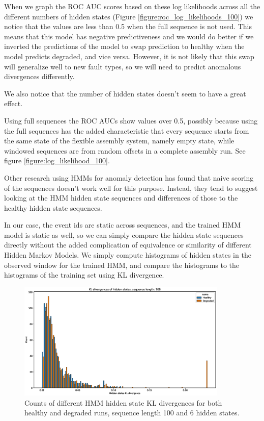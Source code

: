 \documentclass[journal]{IEEEtran}
\begin{document}
When we graph the ROC AUC scores based on these log likelihoods across all the different numbers of hidden states (Figure \ref{figure:roc_log_likelihoods_100}) we notice that the values are less than 0.5 when the full sequence is not used. This means that this model has negative predictiveness and we would do better if we inverted the predictions of the model to swap prediction to healthy when the model predicts degraded, and vice versa. However, it is not likely that this swap will generalize well to new fault types, so we will need to predict anomalous divergences differently.

We also notice that the number of hidden states doesn't seem to have a great effect.

Using full sequences the ROC AUCs show values over 0.5, possibly because using the full sequences has the added characteristic that every sequence starts from the same state of the flexible assembly system, namely empty state, while windowed sequences are from random offsets in a complete assembly run. See figure \ref{figure:log_likelihood_100}.

Other research using HMMs for anomaly detection has found that naive scoring of the sequences doesn't work well for this purpose\cite{gornitz2015hidden}. Instead, they tend to suggest looking at the HMM hidden state sequences and differences of those to the healthy hidden state sequences.

In our case, the event ids are static across sequences, and the trained HMM model is static as well, so we can simply compare the hidden state sequences directly without the added complication of equivalence or similarity of different Hidden Markov Models. We simply compute histograms of hidden states in the observed window for the trained HMM, and compare the histograms to the histograms of the training set using KL divergence.

\begin{figure}[tb]
 \centering
 \includegraphics[width=10cm,keepaspectratio=true]{./kl_histograms_100.eps}
 \caption{Counts of different HMM hidden state KL divergences for both healthy and degraded runs, sequence length 100 and 6 hidden states.}
 \label{figure:kl_100}
\end{figure}
\end{document}

